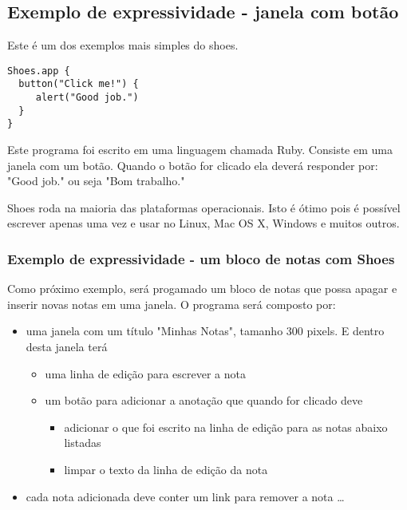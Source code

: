 \documentclass[12pt]{article}
\begin{document}
\subsection{ Exemplo de expressividade - janela com botão }

Este é um dos exemplos mais simples do shoes. 

\begin{lstlisting}[caption=Primeiro exemplo do framework Shoes  ]
Shoes.app { 
  button("Click me!") {
     alert("Good job.") 
  }
} 
\end{lstlisting}

Este programa foi escrito em uma linguagem chamada Ruby. Consiste em uma janela com um botão. Quando o botão for clicado ela deverá responder por: "Good job." ou seja "Bom trabalho."

Shoes roda na maioria das plataformas operacionais. Isto é ótimo pois é possível escrever apenas uma vez e usar no Linux, Mac OS X, Windows e muitos outros.


\subsubsection{ Exemplo de expressividade - um bloco de notas com Shoes }

Como próximo exemplo, será progamado um bloco de notas que possa apagar e inserir novas notas em uma janela. O programa será composto por:
\begin{itemize} 
  \item uma janela com um título "Minhas Notas", tamanho 300 pixels. E dentro desta janela terá 
  \begin{itemize} 
    \item uma linha de edição para escrever a nota
    \item um botão para adicionar a anotação que quando for clicado deve 
    \begin{itemize} 
      \item adicionar o que foi escrito na linha de edição para as notas abaixo listadas
      \item limpar o texto da linha de edição da nota
    \end{itemize} 
  \end{itemize} 
  \item cada nota adicionada deve conter um link para remover a nota \ldots
\end{itemize} 
\end{document}
